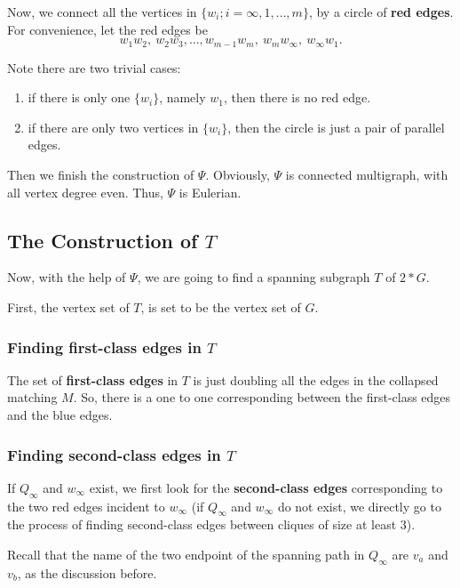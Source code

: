 \documentclass[12pt]{article}
\begin{document}
Now, we connect all the vertices in $\{w_i;i=\infty,1,\ldots,m\}$, by a circle of {\bf red edges}. For convenience, let the red edges be $$w_1w_2,~w_2w_3,\ldots,w_{m-1}w_m,~w_mw_{\infty},~w_{\infty}w_1.$$

 Note there are two trivial cases:
\begin{enumerate}
\item if there is only one $\{w_i\}$, namely $w_1$, then there is no red edge.
\item if there are only two vertices in $\{w_i\}$, then the circle is just a pair of parallel edges.
\end{enumerate}

Then we finish the construction of $\Psi$. Obviously, $\Psi$ is connected multigraph, with all vertex degree even. Thus, $\Psi$ is Eulerian.







\subsection{The Construction of $T$}


Now, with the help of $\Psi$, we are going to find a spanning subgraph $T$ of $2*G$.

First, the vertex set of $T$, is set to be the vertex set of $G$.

\subsubsection{
Finding first-class edges in $T$}
The set of {\bf first-class edges} in $T$ is just doubling all the edges in the collapsed matching $M$. So, there is a one to one corresponding between the first-class edges and the blue edges.



\subsubsection{
Finding second-class edges in $T$}
If $Q_{\infty}$ and $w_{\infty}$ exist, we first look for the {\bf second-class edges} corresponding to the two red edges incident to $w_{\infty}$ (if $Q_{\infty}$ and $w_{\infty}$ do not exist, we directly go to the process of finding second-class edges between cliques of size at least 3).


Recall that the name of the two endpoint of the spanning path in $Q_{\infty}$ are $v_a$ and $v_b$, as the discussion before.
\end{document}
